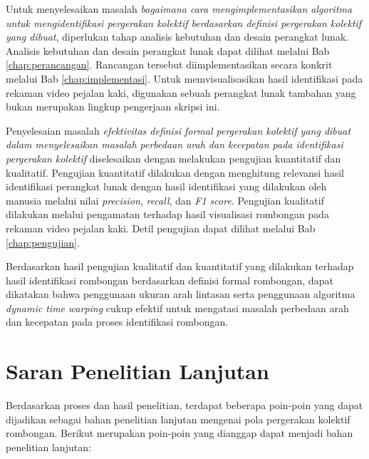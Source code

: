 Untuk menyelesaikan masalah \textit{bagaimana cara mengimplementasikan algoritma untuk mengidentifikasi pergerakan kolektif berdasarkan definisi pergerakan kolektif yang dibuat}, diperlukan tahap analisis kebutuhan dan desain perangkat lunak. Analisis kebutuhan dan desain perangkat lunak dapat dilihat melalui Bab \ref{chap:perancangan}. Rancangan tersebut diimplementasikan secara konkrit melalui Bab \ref{chap:implementasi}. Untuk memvisualisasikan hasil identifikasi pada rekaman video pejalan kaki, digunakan sebuah perangkat lunak tambahan yang bukan merupakan lingkup pengerjaan skripsi ini.

Penyelesaian masalah \textit{efektivitas definisi formal pergerakan kolektif yang dibuat dalam menyelesaikan masalah perbedaan arah dan kecepatan pada identifikasi pergerakan kolektif} diselesaikan dengan melakukan pengujian kuantitatif dan kualitatif. Pengujian kuantitatif dilakukan dengan menghitung relevansi hasil identifikasi perangkat lunak dengan hasil identifikasi yang dilakukan oleh manusia melalui nilai \textit{precision}, \textit{recall}, dan \textit{F1 score}. Pengujian kualitatif dilakukan melalui pengamatan terhadap hasil visualisasi rombongan pada rekaman video pejalan kaki. Detil pengujian dapat dilihat melalui Bab \ref{chap:pengujian}.

Berdasarkan hasil pengujian kualitatif dan kuantitatif yang dilakukan terhadap hasil identifikasi rombongan berdasarkan definisi formal rombongan, dapat dikatakan bahwa penggunaan ukuran arah lintasan serta penggunaan algoritma \textit{dynamic time warping} cukup efektif untuk mengatasi masalah perbedaan arah dan kecepatan pada proses identifikasi rombongan.

\section{Saran Penelitian Lanjutan}
\label{sec:saran}

Berdasarkan proses dan hasil penelitian, terdapat beberapa poin-poin yang dapat dijadikan sebagai bahan penelitian lanjutan mengenai pola pergerakan kolektif rombongan. Berikut merupakan poin-poin yang dianggap dapat menjadi bahan penelitian lanjutan:

